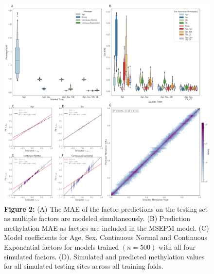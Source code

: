 \documentclass{article}
\begin{document}
{\begin{center}
    \begin{figure}
    \includegraphics[scale=.2]{Figures/Figure2.png}
    \footnotesize
    \caption*{\small \textbf{Figure 2:} (A) The MAE of the factor predictions on the testing set as multiple factors 
    are modeled simultaneously. (B) Prediction methylation MAE as factors are included in the MSEPM model. (C) 
    Model coefficients for Age, Sex, Continuous Normal and Continuous Exponential factors for models trained 
    $(n=500)$ with all four simulated factors. (D). Simulated and predicted methylation values for all simulated 
    testing sites across all training folds. }
    \end{figure}
\end{center}


}
\end{document}
